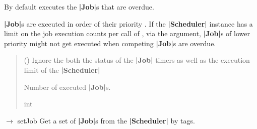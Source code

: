 \documentclass[letterpaper,10pt,english]{sphinxmanual}
\begin{document}
\begin{fulllineitems}
\begin{fulllineitems}
\sphinxAtStartPar
By default executes the {\color{red}\bfseries{}|Job|}s that are overdue.

\sphinxAtStartPar
{\color{red}\bfseries{}|Job|}s are executed in order of their priority
. If the {\color{red}\bfseries{}|Scheduler|} instance
has a limit on the job execution counts per call of
, via the  argument,
{\color{red}\bfseries{}|Job|}s of lower priority might not get executed when
competing {\color{red}\bfseries{}|Job|}s are overdue.
\begin{quote}\begin{description}
\sphinxAtStartPar
{} () \textendash{} Ignore the both \sphinxhyphen{} the status of the {\color{red}\bfseries{}|Job|} timers
as well as the execution limit of the {\color{red}\bfseries{}|Scheduler|}

\sphinxAtStartPar
Number of executed {\color{red}\bfseries{}|Job|}s.

\sphinxAtStartPar
int

\end{description}\end{quote}

\end{fulllineitems}


\begin{fulllineitems}
\label{\detokenize{index:scheduler.Scheduler.get_jobs}}
\pysigstartsignatures
\pysiglinewithargsret
{}
{\sphinxparamcomma {}}
{{ $\rightarrow$ set\DUrole{p}{{[}}Job\DUrole{p}{{]}}}}
\pysigstopsignatures
\sphinxAtStartPar
Get a set of {\color{red}\bfseries{}|Job|}s from the {\color{red}\bfseries{}|Scheduler|} by tags.


\end{fulllineitems}
\end{fulllineitems}
\end{document}
